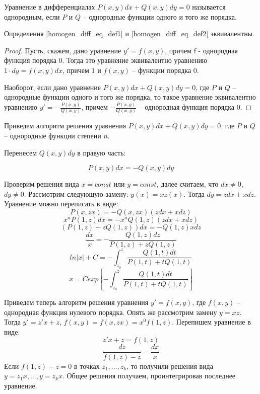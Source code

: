 \documentclass[document.tex]{subfiles}
\begin{document}
\begin{definition}
\label{homogen_diff_eq_def2}
Уравнение в дифференциалах $P(x, y)dx + Q(x, y)dy = 0$ называется однородным, если $P$ и $Q$ -- однородные функции одного и того же порядка.
\end{definition}
\begin{statement}
Определения \ref{homogen_diff_eq_def1} и \ref{homogen_diff_eq_def2} эквивалентны.
\end{statement}
\begin{proof}
Пусть, скажем, дано уравнение $y' = f(x, y)$, причем f - однородная функция порядка 0. Тогда это уравнение эквивалентно уравнению $1 \cdot dy = f(x, y)dx$, причем $1$ и $f(x, y)$ -- функции порядка 0.

Наоборот, если дано уравнение $P(x, y)dx + Q(x, y)dy = 0$, где $P$ и $Q$ -- однородные функции одного и того же порядка, то такое уравнение эквивалентно уравнению $y' = -\frac{P(x, y)}{Q(x, y)}$, причем $-\frac{P(x, y)}{Q(x, y)}$ -- однородная функция порядка 0.
\end{proof}
\begin{remark}
Приведем алгоритм решения уравнения $P(x, y)dx + Q(x, y)dy = 0$, где $P$ и $Q$ -- однородные функции степени $n$.

Перенесем $Q(x, y)dy$ в правую часть:

$$P(x, y)dx = -Q(x, y)dy$$

Проверим решения вида $x = const$ или $y = const$, далее считаем, что $dx \neq 0$, $dy \neq 0$. Рассмотрим следующую замену: $y(x) = xz(x)$. Тогда $dy = zdx+xdz$. Уравнение можно переписать в виде:
$$P(x, zx) = -Q(x, zx)(zdx+xdz)$$
$$x^nP(1, z)dx = -x^nQ(1, z)(zdx+xdz)$$
$$(P(1, z)+zQ(1, z))dx = -Q(1, z)xdz$$
$$\frac{dx}{x} = -\frac{Q(1, z)dz}{P(1, z)+zQ(1, z)}$$
$$ln|x| + C = -\int^{z}_{z_0}\frac{Q(1, t)dt}{P(1, t)+tQ(1, t)}$$
$$x = Cexp\left[-\int^{z}_{z_0}\frac{Q(1, t)dt}{P(1, t)+tQ(1, t)}\right]$$

\end{remark}
\begin{remark}
Приведем теперь алгоритм решения уравнения $y' = f(x, y)$, где $f(x, y)$ -- однородная функция нулевого порядка. Опять же рассмотрим замену $y = xz$. Тогда $y' = z'x + z$, $f(x, y) = f(x, zx) = x^0f(1, z)$. Перепишем уравнение в виде:
$$z'x+z = f(1, z)$$
$$\frac{dz}{f(1,z)-z} = \frac{dx}{x}$$
Если $f(1, z) - z = 0$ в точках $z_1, \ldots, z_k$, то получили решения вида $y = z_1x, \ldots, y = z_kx$. Общее решения получаем, проинтегрировав последнее уравнение.
\end{remark}
\end{document}
